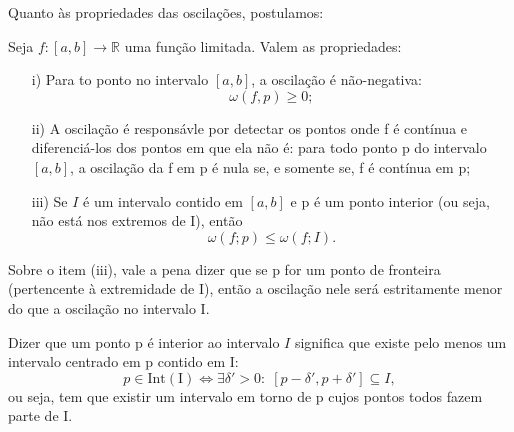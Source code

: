\documentclass[../analysisII_notes.tex]{subfiles}
\begin{document}
Quanto às propriedades das oscilações, postulamos:
\begin{prop*}
	Seja \(f:[a, b]\rightarrow \mathbb{R}\) uma função limitada. Valem as propriedades:
	\begin{itemize}
		\item[i)] Para to ponto no intervalo \([a, b]\), a oscilação é não-negativa:
		      \[
			      \omega (f, p)\geq 0;
		      \]
		\item[ii)] A oscilação é responsávle por detectar os pontos onde f é contínua e diferenciá-los dos pontos em que ela não é: para todo ponto p do intervalo \([a, b]\), a oscilação da f em p é nula se, e somente se, f é contínua em p;
		\item[iii)] Se \(I\) é um intervalo contido em \([a, b]\) e p é um ponto interior (ou seja, não está nos extremos de I), então
		      \[
			      \omega (f; p) \leq \omega (f; I).
		      \]
	\end{itemize}
\end{prop*}
Sobre o item (iii), vale a pena dizer que se p for um ponto de fronteira (pertencente à extremidade de I), então a oscilação nele será estritamente menor do que a oscilação no intervalo I.
\begin{tcolorbox}[
		skin=enhanced,
		title=Lembrete!,
		after title={\hfill Ponto interior},
		fonttitle=\bfseries,
		sharp corners=downhill,
		colframe=black,
		colbacktitle=yellow!75!white,
		colback=yellow!30,
		colbacklower=black,
		coltitle=black,
		drop large lifted shadow
	]
	Dizer que um ponto p é interior ao intervalo \(I\) significa que existe pelo menos um intervalo centrado em p contido em I:
	\[
		p\in \mathrm{Int(I)} \Longleftrightarrow \exists \delta'>0:\; [p-\delta', p+\delta '] \subseteq I,
	\]
	ou seja, tem que existir um intervalo em torno de p cujos pontos todos fazem parte de I.
\end{tcolorbox}
\end{document}
